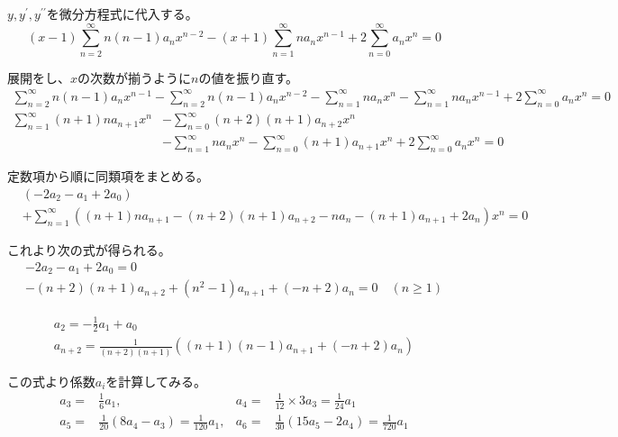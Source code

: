 \documentclass[12pt,b5paper]{ltjsarticle}
\begin{document}



$y,y^{\prime},y^{\prime\prime}$を微分方程式に代入する。
\begin{equation}
 (x-1)\sum_{n=2}^{\infty}n(n-1)a_n x^{n-2}
  - (x+1) \sum_{n=1}^{\infty}na_n x^{n-1}
  + 2 \sum_{n=0}^{\infty}a_n x^n =0
\end{equation}

展開をし、$x$の次数が揃うように$n$の値を振り直す。
\begin{gather}
 \sum_{n=2}^{\infty}n(n-1)a_n x^{n-1}
  -\sum_{n=2}^{\infty}n(n-1)a_n x^{n-2}
  - \sum_{n=1}^{\infty}na_n x^{n}
  - \sum_{n=1}^{\infty}na_n x^{n-1}
  +2 \sum_{n=0}^{\infty}a_n x^n =0
\end{gather}
\begin{equation}
 \begin{split}
 \sum_{n=1}^{\infty}(n+1)na_{n+1} x^{n}
  &-\sum_{n=0}^{\infty}(n+2)(n+1)a_{n+2} x^{n}\\
  &- \sum_{n=1}^{\infty}na_n x^{n}
  - \sum_{n=0}^{\infty}(n+1)a_{n+1} x^{n}
  +2 \sum_{n=0}^{\infty}a_n x^n =0
 \end{split}
\end{equation}

定数項から順に同類項をまとめる。
\begin{equation}
 \begin{split}
  & ( -2a_2 -a_1 +2a_0 )\\
  & + \sum_{n=1}^{\infty}(
  (n+1)na_{n+1}
  -(n+2)(n+1)a_{n+2}
  -na_{n}
  -(n+1)a_{n+1}
  +2a_n
  )x^n
  =0
 \end{split}
\end{equation}

これより次の式が得られる。
\begin{gather}
 -2a_2 -a_1 +2a_0 = 0\\
  -(n+2)(n+1)a_{n+2}
  +( n^2-1 )a_{n+1}
  + (-n+2)a_n
 =0
 \quad (n\geq 1)
\end{gather}

\begin{gather}
 a_2 = -\frac{1}{2}a_1 + a_0\\
 a_{n+2}
  = \frac{1}{(n+2)(n+1)}(
   (n+1)(n-1)a_{n+1} +(-n+2)a_n
 )
 \label{recurr2}
\end{gather}

この式より係数$a_i$を計算してみる。
\begin{align}
 a_3 =& \frac{1}{6}a_1
  ,&
 a_4 =& \frac{1}{12}\times 3a_3=\frac{1}{24}a_1\\
 a_5 =& \frac{1}{20}(8a_4-a_3)=\frac{1}{120}a_1
 ,&
 a_6 =& \frac{1}{30}(15a_5-2a_4) =\frac{1}{720}a_1
\end{align}
\end{document}
